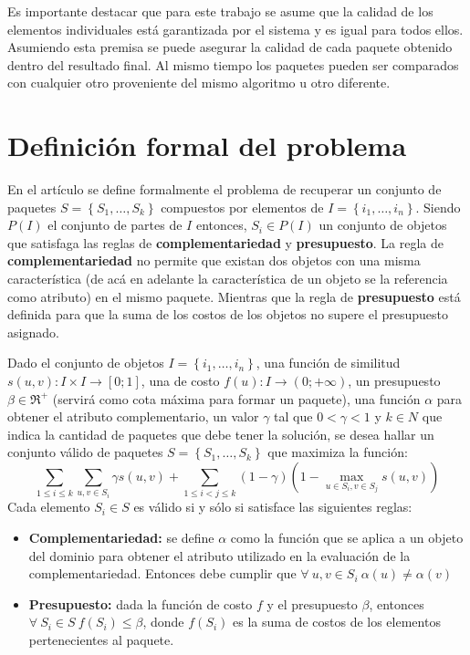 Es importante destacar que para este trabajo se asume que la calidad de los elementos individuales está garantizada por el sistema y es igual para todos ellos. Asumiendo esta premisa se puede asegurar la calidad de cada paquete obtenido dentro del resultado final. Al mismo tiempo los paquetes pueden ser comparados con cualquier otro proveniente del mismo algoritmo u otro diferente.

\section{Definición formal del problema}\label{introduccion:problemaFormal}
En el artículo \cite{journals/tkde/Amer-YahiaBCFMZ14} se define formalmente el problema de recuperar un conjunto de paquetes $S = \left\{S_1, \ldots, S_k\right\}$ compuestos por elementos de $I=\left\{i_1,\ldots, i_n\right\}$. Siendo $P(I)$ el conjunto de partes de $I$ entonces,  $S_i \in P(I)$ un conjunto de objetos que satisfaga las reglas de \textbf{complementariedad} y \textbf{presupuesto}. La regla de \textbf{complementariedad} no permite que existan dos objetos con una misma característica (de acá en adelante la característica de un objeto se la referencia como atributo) en el mismo paquete. Mientras que la regla de \textbf{presupuesto} está definida para que la suma de los costos de los objetos no supere el presupuesto asignado.

Dado el conjunto de objetos $I=\left\{i_1,\ldots, i_n\right\}$, una función de similitud $s(u,v): I \times I \rightarrow [0;1]$, una de costo $f(u): I \rightarrow (0;+\infty)$, un presupuesto $\beta \in \Re^{+}$ (servirá como cota máxima para formar un paquete), una función $\alpha$ para obtener el atributo complementario, un valor $\gamma$ tal que $0 < \gamma < 1$ y $k \in N$ que indica la cantidad de paquetes que debe tener la solución, se desea hallar un conjunto válido de paquetes $S = \left\{S_1, \ldots, S_k\right\}$ que maximiza la función:
\begin{equation} \label{des:eq-fnObj}
\sum_{1 \leq i \leq k}{\sum_{u,v \in S_i}{\gamma s(u,v)}} + \sum_{1 \leq i < j \leq k}{(1-\gamma) (1-\max_{u \in S_i, v \in S_j}{s(u,v)})}
\end{equation}
Cada elemento $S_i \in S$ es válido si y sólo si satisface las siguientes reglas:
\begin{itemize}
	\item \textbf{Complementariedad:} se define $\alpha$ como la función que se aplica a un objeto del dominio para obtener el atributo utilizado en la evaluación de la complementariedad. Entonces debe cumplir que $\forall\ u,v \in S_i\ \alpha(u) \neq \alpha(v)$
	\item \textbf{Presupuesto:} dada la función de costo $f$ y el presupuesto $\beta$, entonces $\forall\ S_i \in S\ f(S_i) \leq \beta$, donde $f(S_i)$ es la suma de costos de los elementos pertenecientes al paquete.
\end{itemize}  

